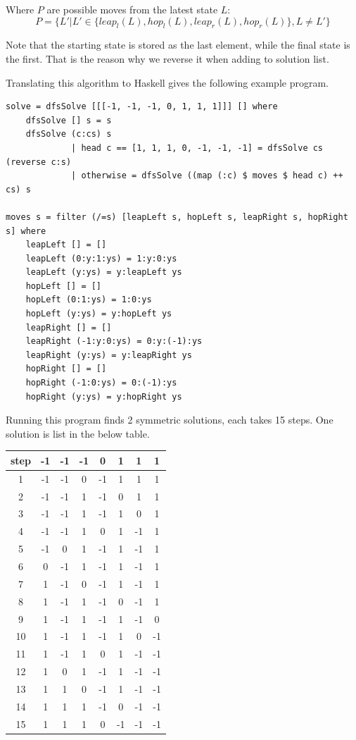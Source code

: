 \documentclass[UTF8]{article}
\begin{document}
Where $P$ are possible moves from the latest state $L$:
\[
P = \{ L'  | L' \in \{leap_l(L), hop_l(L), leap_r(L), hop_r(L)\}, L \neq L'\}
\]

Note that the starting state is stored as the last element, while the
final state is the first. That is the reason why we reverse it when adding
to solution list.

Translating this algorithm to Haskell gives the following example program.

\lstset{language=Haskell}
\begin{lstlisting}
solve = dfsSolve [[[-1, -1, -1, 0, 1, 1, 1]]] [] where
    dfsSolve [] s = s
    dfsSolve (c:cs) s
             | head c == [1, 1, 1, 0, -1, -1, -1] = dfsSolve cs (reverse c:s)
             | otherwise = dfsSolve ((map (:c) $ moves $ head c) ++ cs) s

moves s = filter (/=s) [leapLeft s, hopLeft s, leapRight s, hopRight s] where
    leapLeft [] = []
    leapLeft (0:y:1:ys) = 1:y:0:ys
    leapLeft (y:ys) = y:leapLeft ys
    hopLeft [] = []
    hopLeft (0:1:ys) = 1:0:ys
    hopLeft (y:ys) = y:hopLeft ys
    leapRight [] = []
    leapRight (-1:y:0:ys) = 0:y:(-1):ys
    leapRight (y:ys) = y:leapRight ys
    hopRight [] = []
    hopRight (-1:0:ys) = 0:(-1):ys
    hopRight (y:ys) = y:hopRight ys
\end{lstlisting}

Running this program finds 2 symmetric solutions, each takes 15 steps. One solution
is list in the below table.

\begin{tabular}{|c||c|c|c|c|c|c|c|}
\hline
step & -1 & -1 & -1 & 0 & 1 & 1 & 1 \\
\hline
1 & -1 & -1 & 0 & -1 & 1 & 1 & 1 \\
2 & -1 & -1 & 1 & -1 & 0 & 1 & 1 \\
3 & -1 & -1 & 1 & -1 & 1 & 0 & 1 \\
4 & -1 & -1 & 1 & 0 & 1 & -1 & 1 \\
5 & -1 & 0 & 1 & -1 & 1 & -1 & 1 \\
6 & 0 & -1 & 1 & -1 & 1 & -1 & 1 \\
7 & 1 & -1 & 0 & -1 & 1 & -1 & 1 \\
8 & 1 & -1 & 1 & -1 & 0 & -1 & 1 \\
9 & 1 & -1 & 1 & -1 & 1 & -1 & 0 \\
10 & 1 & -1 & 1 & -1 & 1 & 0 & -1 \\
11 & 1 & -1 & 1 & 0 & 1 & -1 & -1 \\
12 & 1 & 0 & 1 & -1 & 1 & -1 & -1 \\
13 & 1 & 1 & 0 & -1 & 1 & -1 & -1 \\
14 & 1 & 1 & 1 & -1 & 0 & -1 & -1 \\
15 & 1 & 1 & 1 & 0 & -1 & -1 & -1 \\
\hline
\end{tabular}
\end{document}
